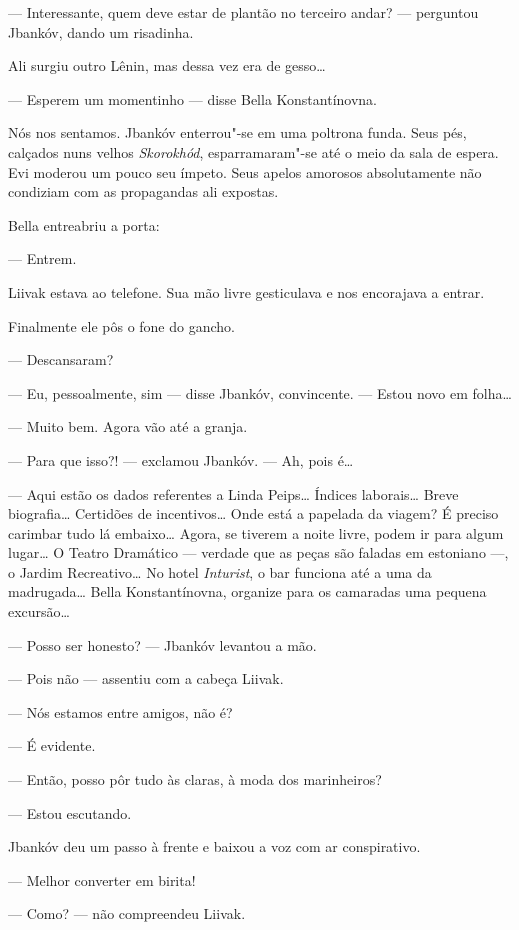 --- Interessante, quem deve estar de plantão no terceiro andar?
--- perguntou Jbankóv, dando um risadinha.

Ali surgiu outro Lênin, mas dessa vez era de gesso\ldots{}

--- Esperem um momentinho --- disse Bella Konstantínovna.

Nós nos sentamos. Jbankóv enterrou"-se em uma poltrona funda. Seus pés,
calçados nuns velhos \emph{Skorokhód}, esparramaram"-se até o meio da
sala de espera. Evi moderou um pouco seu ímpeto. Seus apelos amorosos
absolutamente não condiziam com as propagandas ali expostas.

Bella entreabriu a porta:

--- Entrem.

Liivak estava ao telefone. Sua mão livre gesticulava e nos encorajava a
entrar.

Finalmente ele pôs o fone do gancho.

--- Descansaram?

--- Eu, pessoalmente, sim --- disse Jbankóv, convincente.
--- Estou novo em folha\ldots{}

--- Muito bem. Agora vão até a granja.

--- Para que isso?! --- exclamou Jbankóv. --- Ah,
pois é\ldots{}

--- Aqui estão os dados referentes a Linda Peips\ldots{} Índices
laborais\ldots{} Breve biografia\ldots{} Certidões de incentivos\ldots{} Onde está a
papelada da viagem? É preciso carimbar tudo lá embaixo\ldots{} Agora, se
tiverem a noite livre, podem ir para algum lugar\ldots{} O Teatro Dramático
--- verdade que as peças são faladas em estoniano ---, o
Jardim Recreativo\ldots{} No hotel \emph{Inturist}, o bar funciona até a uma
da madrugada\ldots{} Bella Konstantínovna, organize para os camaradas uma
pequena excursão\ldots{}

--- Posso ser honesto? --- Jbankóv levantou a mão.

--- Pois não --- assentiu com a cabeça Liivak.

--- Nós estamos entre amigos, não é?

--- É evidente.

--- Então, posso pôr tudo às claras, à moda dos marinheiros?

--- Estou escutando.

Jbankóv deu um passo à frente e baixou a voz com ar conspirativo.

--- Melhor converter em birita!

--- Como? --- não compreendeu Liivak.

